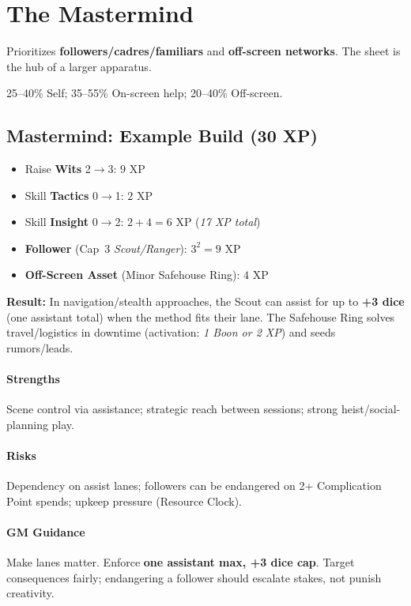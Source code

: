 \documentclass[12pt]{book}
\begin{document}
\section{The Mastermind}
\begin{description}[leftmargin=2cm]
  \item[Definition:] Prioritizes \textbf{followers/cadres/familiars} and \textbf{off-screen networks}. The sheet is the hub of a larger apparatus.
  \item[Typical XP Spread:] 25--40\% Self; 35--55\% On-screen help; 20--40\% Off-screen.
\end{description}

\subsection*{Mastermind: Example Build (30 XP)}
\begin{itemize}
  \item Raise \textbf{Wits} 2$\rightarrow$3: $9$ XP
  \item Skill \textbf{Tactics} 0$\rightarrow$1: $2$ XP
  \item Skill \textbf{Insight} 0$\rightarrow$2: $2+4=6$ XP \hfill (\emph{17 XP total})
  \item \textbf{Follower} (Cap~3 \emph{Scout/Ranger}): $3^2=9$ XP
  \item \textbf{Off-Screen Asset} (Minor Safehouse Ring): $4$ XP
\end{itemize}

\textbf{Result:} In navigation/stealth approaches, the Scout can assist for up to \textbf{+3 dice} (one assistant total) when the method fits their lane.  
The Safehouse Ring solves travel/logistics in downtime (activation: \emph{1 Boon or 2 XP}) and seeds rumors/leads.

\paragraph{Strengths} Scene control via assistance; strategic reach between sessions; strong heist/social-planning play.  
\paragraph{Risks} Dependency on assist lanes; followers can be endangered on 2+ Complication Point spends; upkeep pressure (Resource Clock).  
\paragraph{GM Guidance} Make lanes matter. Enforce \textbf{one assistant max, +3 dice cap}. Target consequences fairly; endangering a follower should escalate stakes, not punish creativity.
\end{document}
